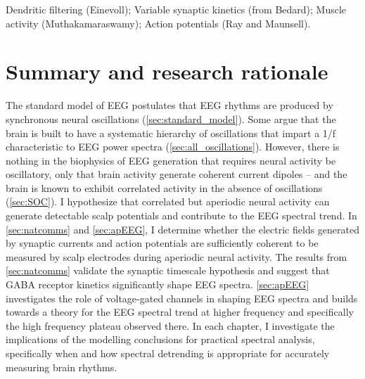 Dendritic filtering (Einevoll); Variable synaptic kinetics (from Bedard); Muscle activity (Muthakamaraswamy); Action potentials (Ray and Maunsell).

\section{Summary and research rationale}
The standard model of EEG postulates that EEG rhythms are produced by synchronous neural oscillations (\autoref{sec:standard_model}). Some argue that the brain is built to have a systematic hierarchy of oscillations that impart a 1/f characteristic to EEG power spectra (\autoref{sec:all_oscillations}). However, there is nothing in the biophysics of EEG generation that requires neural activity be oscillatory, only that brain activity generate coherent current dipoles -- and the brain is known to exhibit correlated activity in the absence of oscillations (\autoref{sec:SOC}). I hypothesize that correlated but aperiodic neural activity can generate detectable scalp potentials and contribute to the EEG spectral trend. In \autoref{sec:natcomms} and \autoref{sec:apEEG}, I determine whether the electric fields generated by synaptic currents and action potentials are sufficiently coherent to be measured by scalp electrodes during aperiodic neural activity. The results from \autoref{sec:natcomms} validate the synaptic timescale hypothesis and suggest that GABA receptor kinetics significantly shape EEG spectra. \autoref{sec:apEEG} investigates the role of voltage-gated channels in shaping EEG spectra and builds towards a theory for the EEG spectral trend at higher frequency and specifically the high frequency plateau observed there. In each chapter, I investigate the implications of the modelling conclusions for practical spectral analysis, specifically when and how spectral detrending is appropriate for accurately measuring brain rhythms.

